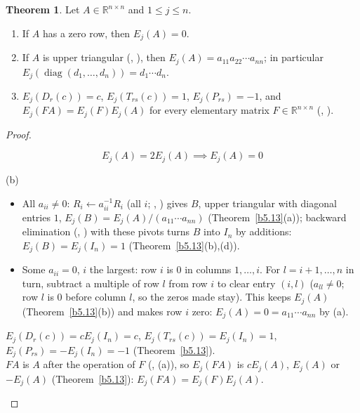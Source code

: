 \documentclass[12pt]{article}
\newcommand{\R}{\mathbb R}
\DeclareMathOperator{\diag}{diag}
\theoremstyle{definition}
\newtheorem{theorem}{Theorem}
\begin{document}
\begin{theorem}\label{b5.14}
Let \(A\in\R^{n\times n}\) and \(1\leqslant j\leqslant n\).
\begin{enumerate}
\item If \(A\) has a zero row, then \(E_j(A)=0\).
\item If \(A\) is upper triangular (, ), then \(E_j(A)=a_{11}a_{22}\cdots a_{nn}\); in particular
\(E_j(\diag(d_1,\dots,d_n))=d_1\cdots d_n\).
\item \(E_j(D_r(c))=c\), \(E_j(T_{rs}(c))=1\), \(E_j(P_{rs})=-1\), and \(E_j(FA)=E_j(F)E_j(A)\) for every elementary matrix
\(F\in\R^{n\times n}\) (, ).
\end{enumerate}
\end{theorem}
\begin{proof}
\begin{board}
\[
E_j(A)=2E_j(A)\implies E_j(A)=0
\]
\end{board}
(b)
\begin{itemize}
\item All \(a_{ii}\ne0\): \(R_i\leftarrow a_{ii}^{-1}R_i\) (all \(i\); , ) gives \(B\), upper triangular with diagonal entries
\(1\), \(E_j(B)=E_j(A)/(a_{11}\cdots a_{nn})\) (Theorem~\ref{b5.13}(a)); backward elimination (, ) with
these pivots turns \(B\) into \(I_n\) by additions: \(E_j(B)=E_j(I_n)=1\) (Theorem~\ref{b5.13}(b),(d)).
\item Some \(a_{ii}=0\), \(i\) the largest: row \(i\) is \(0\) in columns \(1,\dots,i\). For \(l=i+1,\dots,n\) in turn,
subtract a multiple of row \(l\) from row \(i\) to clear entry \((i,l)\) (\(a_{ll}\ne0\); row \(l\) is \(0\) before column
\(l\), so the zeros made stay). This keeps \(E_j(A)\) (Theorem~\ref{b5.13}(b)) and makes row \(i\) zero:
\(E_j(A)=0=a_{11}\cdots a_{nn}\) by (a).
\end{itemize}
\begin{board}
\(E_j(D_r(c))=cE_j(I_n)=c\), \(E_j(T_{rs}(c))=E_j(I_n)=1\), \(E_j(P_{rs})=-E_j(I_n)=-1\)
(Theorem~\ref{b5.13}).\\
\(FA\) is \(A\) after the operation of \(F\) (, (a)), so \(E_j(FA)\) is \(cE_j(A)\),
\(E_j(A)\) or \(-E_j(A)\) (Theorem~\ref{b5.13}): \(E_j(FA)=E_j(F)E_j(A)\).
\end{board}
\nopagebreak
\end{proof}
\end{document}
